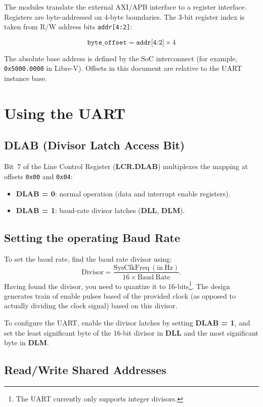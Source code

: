 The modules translate the external AXI/APB interface to a register interface. Registers are byte-addressed on 4-byte boundaries. The 3-bit register index is taken from R/W address bits \texttt{addr[4:2]}:

\[
\texttt{byte\_offset} = \texttt{addr[4:2]} \times 4
\]

The absolute base address is defined by the SoC interconnect (for example, \texttt{0x5000.0000} in Libre-V). Offsets in this document are relative to the UART instance base.

\section{Using the UART}

\subsection{DLAB (Divisor Latch Access Bit)}

Bit~7 of the Line Control Register (\textbf{LCR.DLAB}) multiplexes the mapping at offsets
\texttt{0x00} and \texttt{0x04}:

\begin{itemize}[nosep]
  \item \textbf{DLAB = 0}: normal operation (data and interrupt enable registers).
  \item \textbf{DLAB = 1}: baud-rate divisor latches (\textbf{DLL}, \textbf{DLM}).
\end{itemize}

\subsection{Setting the operating Baud Rate}
To set the baud rate, find the baud rate divisor using:
\[
\mathrm{Divisor} = \frac{\mathrm{SysClkFreq\ (in\ Hz)}}{16 \times \mathrm{Baud\ Rate}}.
\] 
Having found the divisor, you need to quantize it to 16-bits\footnote{The UART currently only supports integer divisors.}. The design generates train of enable pulses based of the provided clock (as opposed to actually dividing the clock signal) based on this divisor. 

To configure the UART, enable the divisor latches by setting \textbf{DLAB = 1}, and set the least significant byte of the 16-bit divisor in \textbf{DLL} and the most significant byte in \textbf{DLM}. 

\subsection{Read/Write Shared Addresses}

